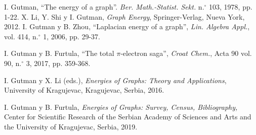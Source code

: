 \begin{thebibliography}{99}
{%
\vspace{-0.1cm}
 I. Gutman, \textquotedblleft The energy of a graph\textquotedblright.  \emph{Ber. Math.-Statist. Sekt.} n.$^{\circ}$ 103, 1978, pp. 1-22.
\vspace{-0.1cm}
 X. Li, Y. Shi y I. Gutman, \emph{Graph Energy},
Springer-Verlag, Nueva York, 2012.
\vspace{-0.1cm}
 I. Gutman y B. Zhou, \textquotedblleft Laplacian energy of a graph\textquotedblright, \emph{Lin. Algebra Appl.}, vol. 414, n.$^{\circ}$ 1, 2006, pp. 29-37.

\vspace{-0.1cm}
 I. Gutman y B. Furtula, \textquotedblleft The total $\pi $-electron saga\textquotedblright,
\emph{Croat Chem.}, Acta 90 vol. 90, n.$^{\circ}$ 3, 2017, pp. 359-368.


\vspace{-0.1cm}
 I. Gutman y X. Li (eds.), \emph{Energies of Graphs: Theory
and Applications}, University of Kragujevac, Kragujevac, Serbia, 2016.

\vspace{-0.1cm}
 I. Gutman y B. Furtula, \emph{Energies of Graphs: Survey,
Census, Bibliography,} Center for Scientific Research of the Serbian Academy
of Sciences and Arts and the University of Kragujevac, Serbia, 2019.

}
\end{thebibliography}
